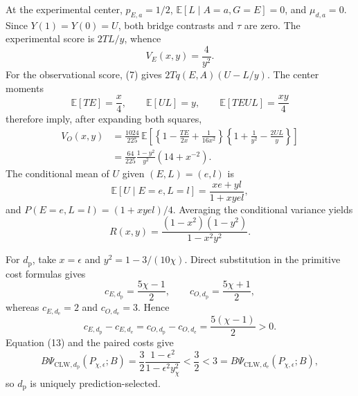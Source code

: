 At the experimental center, \(p_{E,a}=1/2\), \(\mathbb E[L\mid A=a,G=E]=0\), and \(\mu_{d,a}=0\). Since \(Y(1)=Y(0)=U\), both bridge contrasts and \(\tau\) are zero. The experimental score is \(2TL/y\), whence
\[
 V_E(x,y)=\frac4{y^2}.                                  \tag{10}
\]
For the observational score, (7) gives \(2Tq(E,A)(U-L/y)\). The center moments
\[
 \mathbb E[TE]=\frac{x}{4},\qquad
 \mathbb E[UL]=y,
 \qquad
 \mathbb E[TEUL]=\frac{xy}{4}                           \tag{11}
\]
therefore imply, after expanding both squares,
\[
\begin{aligned}
 V_O(x,y)
 &=\frac{1024}{225}\,
 \mathbb E\!\left[
 \left\{1-\frac{TE}{2x}+\frac1{16x^2}\right\}
 \left\{1+\frac1{y^2}-\frac{2UL}{y}\right\}
 \right]\\
 &=\frac{64}{225}\frac{1-y^2}{y^2}\left(14+x^{-2}\right).
                                                               \tag{12}
\end{aligned}
\]
The conditional mean of \(U\) given \((E,L)=(e,l)\) is
\[
 \mathbb E[U\mid E=e,L=l]=\frac{xe+yl}{1+xyel},
\]
and \(P(E=e,L=l)=(1+xyel)/4\). Averaging the conditional variance yields
\[
 R(x,y)=\frac{(1-x^2)(1-y^2)}{1-x^2y^2}.               \tag{13}
\]

For \(d_{\mathrm p}\), take \(x=\epsilon\) and \(y^2=1-3/(10\chi)\). Direct substitution in the primitive cost formulas gives
\[
 c_{E,d_{\mathrm p}}=\frac{5\chi-1}{2},\qquad
 c_{O,d_{\mathrm p}}=\frac{5\chi+1}{2},
\]
whereas \(c_{E,d_{\mathrm e}}=2\) and \(c_{O,d_{\mathrm e}}=3\). Hence
\[
 c_{E,d_{\mathrm p}}-c_{E,d_{\mathrm e}}
 =c_{O,d_{\mathrm p}}-c_{O,d_{\mathrm e}}
 =\frac{5(\chi-1)}2>0.                                 \tag{14}
\]
Equation (13) and the paired costs give
\[
 B\Psi_{\mathrm{CLW},d_{\mathrm p}}(P_{\chi,\epsilon};B)
 =\frac32\frac{1-\epsilon^2}{1-\epsilon^2y_\chi^2}
 <\frac32<3
 =B\Psi_{\mathrm{CLW},d_{\mathrm e}}(P_{\chi,\epsilon};B), \tag{15}
\]
so \(d_{\mathrm p}\) is uniquely prediction-selected.

